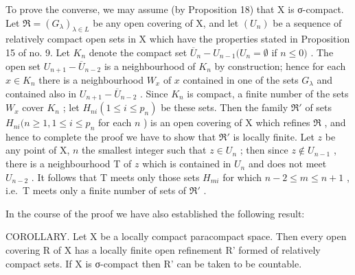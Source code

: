 To prove the converse, we may assume (by Proposition 18) that X is σ-compact. Let \(\Re = (G_{\lambda})_{\lambda \in L}\) be any open covering of X, and let \((U_n)\) be a sequence of relatively compact open sets in X which have the properties stated in Proposition 15 of no. 9. Let \(K_n\) denote the compact set \(\overline{U}_n - U_{n-1}(U_n = \emptyset\) if \(n \leqslant 0)\) . The open set \(U_{n+1} - \overline{U}_{n-2}\) is a neighbourhood of \(K_n\) by construction; hence for each \(x \in K_n\) there is a neighbourhood \(W_x\) of \(x\) contained in one of the sets \(G_{\lambda}\) and contained also in \(U_{n+1} - \overline{U}_{n-2}\) . Since \(K_n\) is compact, a finite number of the sets \(W_x\) cover \(K_n\) ; let \(H_{ni}(1 \leqslant i \leqslant p_n)\) be these sets. Then the family \(\Re'\) of sets \(H_{ni}(n \geqslant 1, 1 \leqslant i \leqslant p_n\) for each \(n\) ) is an open covering of X which refines \(\Re\) , and hence to complete the proof we have to show that \(\Re'\) is locally finite. Let \(z\) be any point of X, \(n\) the smallest integer such that \(z \in U_n\) ; then since \(z \notin U_{n-1}\) , there is a neighbourhood T of \(z\) which is contained in \(U_n\) and does not meet \(U_{n-2}\) . It follows that T meets only those sets \(H_{mi}\) for which \(n - 2 \leqslant m \leqslant n + 1\) , i.e.~T meets only a finite number of sets of \(\Re'\) .

In the course of the proof we have also established the following result:

COROLLARY. Let X be a locally compact paracompact space. Then every open covering R of X has a locally finite open refinement R' formed of relatively compact sets. If X is σ-compact then R' can be taken to be countable.

